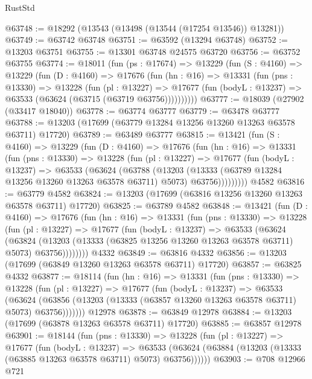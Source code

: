 \begin{lexlean}{RustStd}
\begin{coremodule}
@63748 := @18292 (@13543 (@13498 (@13544 (@17254 @13546)) @13281))
@63749 := @63742 @63748
@63751 := @63592 (@13294 @63748)
@63752 := @13203 @63751
@63755 := @13301 @63748 @24575 @63720
@63756 := @63752 @63755
@63774 := @18011
    (fun (ps : @17674) =>
    @13229
      (fun (S : @4160) =>
      @13229
        (fun (D : @4160) =>
        @17676
          (fun (hn : @16) =>
          @13331
            (fun (pns : @13330) =>
            @13228
              (fun (pl : @13227) =>
              @17677 (fun (bodyL : @13237) => @63533 (@63624 (@63715 (@63719 @63756))))))))))
@63777 := @18039 (@27902 (@33417 @18040))
@63778 := @63774 @63777
@63779 := @63478 @63777
@63788 := @13203 (@17699 (@63779 @13284 @13256 @13260 @13263 @63578 @63711) @17720)
@63789 := @63489 @63777
@63815 := @13421
    (fun (S : @4160) =>
    @13229
      (fun (D : @4160) =>
      @17676
        (fun (hn : @16) =>
        @13331
          (fun (pns : @13330) =>
          @13228
            (fun (pl : @13227) =>
            @17677
              (fun (bodyL : @13237) =>
              @63533
                (@63624
                  (@63788
                    (@13203
                      (@13333 (@63789 @13284 @13256 @13260 @13263 @63578 @63711) @5073)
                      @63756)))))))))
    @4582
@63816 := @63779 @4582
@63824 := @13203 (@17699 (@63816 @13256 @13260 @13263 @63578 @63711) @17720)
@63825 := @63789 @4582
@63848 := @13421
    (fun (D : @4160) =>
    @17676
      (fun (hn : @16) =>
      @13331
        (fun (pns : @13330) =>
        @13228
          (fun (pl : @13227) =>
          @17677
            (fun (bodyL : @13237) =>
            @63533
              (@63624
                (@63824
                  (@13203 (@13333 (@63825 @13256 @13260 @13263 @63578 @63711) @5073) @63756))))))))
    @4332
@63849 := @63816 @4332
@63856 := @13203 (@17699 (@63849 @13260 @13263 @63578 @63711) @17720)
@63857 := @63825 @4332
@63877 := @18114
    (fun (hn : @16) =>
    @13331
      (fun (pns : @13330) =>
      @13228
        (fun (pl : @13227) =>
        @17677
          (fun (bodyL : @13237) =>
          @63533
            (@63624
              (@63856 (@13203 (@13333 (@63857 @13260 @13263 @63578 @63711) @5073) @63756)))))))
    @12978
@63878 := @63849 @12978
@63884 := @13203 (@17699 (@63878 @13263 @63578 @63711) @17720)
@63885 := @63857 @12978
@63901 := @18144
    (fun (pns : @13330) =>
    @13228
      (fun (pl : @13227) =>
      @17677
        (fun (bodyL : @13237) =>
        @63533 (@63624 (@63884 (@13203 (@13333 (@63885 @13263 @63578 @63711) @5073) @63756))))))
@63903 := @708 @12966 @721

\end{coremodule}
\end{lexlean}
